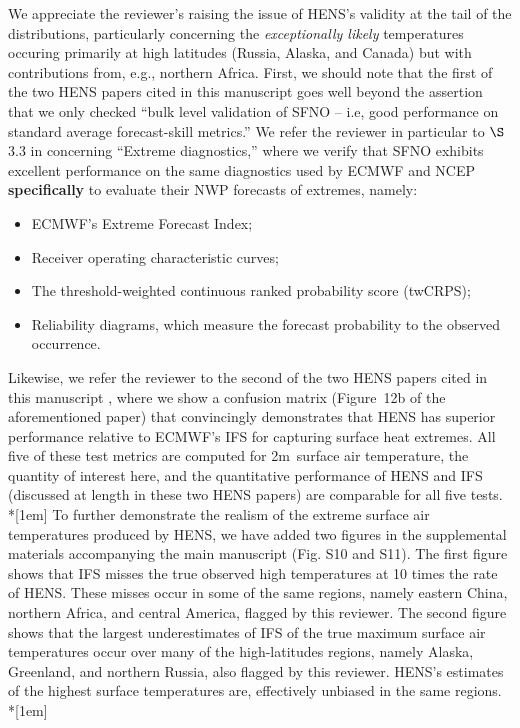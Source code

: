 \documentclass[11pt]{article}
\newcommand{\newTxt}{\textcolor{cadmiumgreen}}
\begin{document}
\begin{enumerate}
\newTxt{We appreciate the reviewer's raising the issue of HENS's validity at the tail of the distributions, particularly concerning the \textit{exceptionally likely} temperatures occuring primarily at high latitudes (Russia, Alaska, and Canada) but with contributions from, e.g., northern Africa.  First, we should note that the first of the two HENS papers cited in this manuscript \citep{Mahesh2024hugeensemblesidesign} %
goes well beyond the assertion that we only checked ``bulk level validation of SFNO -- i.e, good performance on standard average forecast-skill metrics.'' We refer the reviewer in particular to $\S$3.3 in \cite{Mahesh2024hugeensemblesidesign} concerning ``Extreme diagnostics,'' where we verify that SFNO exhibits excellent performance on the same diagnostics used by ECMWF and NCEP \textbf{specifically} to evaluate their NWP forecasts of extremes, namely:
\begin{itemize}
    \item ECMWF's Extreme Forecast Index;
    \item Receiver operating characteristic curves; 
    \item The threshold-weighted continuous ranked probability score (twCRPS); 
    \item Reliability diagrams, which measure the forecast probability to the observed occurrence.
\end{itemize}
Likewise, we refer the reviewer to the second of the two HENS papers cited in this manuscript \citep{Mahesh2024hugeensemblespartii}, %
where we show a confusion matrix (Figure~12b of the aforementioned paper) that convincingly demonstrates that HENS has superior performance relative to ECMWF's IFS for capturing surface heat extremes.  All five of these test metrics are computed for 2m~surface air temperature, the quantity of interest here, and the quantitative performance of HENS and IFS (discussed at length in these two HENS papers) are comparable for all five tests. \\*[1em]
To further demonstrate the realism of the extreme surface air temperatures produced by HENS, we have added two figures in the supplemental materials accompanying the main manuscript (Fig. S10 and S11).  The first figure shows that IFS misses the true observed high temperatures at 10 times the rate of HENS.  These misses occur in some of the same regions, namely eastern China, northern Africa, and central America, flagged by this reviewer.  The second figure shows that the largest underestimates of IFS of the true maximum surface air temperatures occur over many of the high-latitudes regions, namely Alaska, Greenland, and northern Russia, also flagged by this reviewer.  HENS's estimates of the highest surface temperatures are, effectively unbiased in the same regions.\\*[1em]
}
\end{enumerate}
\end{document}
